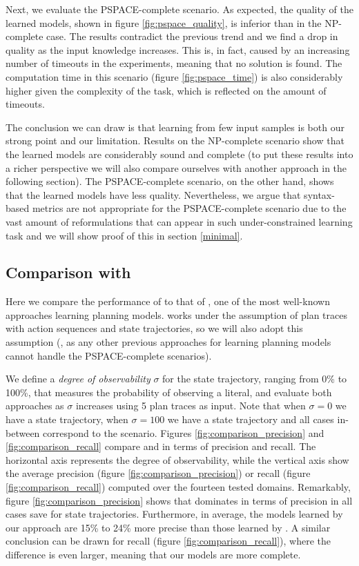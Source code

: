 Next, we evaluate the PSPACE-complete scenario. As expected, the quality of the learned models, shown in figure \ref{fig:pspace_quality}, is inferior than in the NP-complete case. The results contradict the previous trend and we find a drop in quality as the input knowledge increases. This is, in fact, caused by an increasing number of timeouts in the experiments, meaning that no solution is found. The computation time in this scenario (figure \ref{fig:pspace_time}) is also considerably higher given the complexity of the task, which is reflected on the amount of timeouts.

The conclusion we can draw is that learning from few input samples is both our strong point and our limitation. Results on the NP-complete scenario show that the learned models are considerably sound and complete (to put these results into a richer perspective we will also compare ourselves with another approach in the following section). The PSPACE-complete scenario, on the other hand, shows that the learned models have less quality. Nevertheless, we argue that syntax-based metrics are not appropriate for the PSPACE-complete scenario due to the vast amount of reformulations that can appear in such under-constrained learning task and we will show proof of this in section \ref{minimal}.


\subsection{Comparison with \ARMS}
Here we compare the performance of \FAMA to that of \ARMS, one of the most well-known approaches learning planning models. \ARMS works under the assumption of plan traces with \FO action sequences and \NO state trajectories, so we will also adopt this assumption (\ARMS, as any other previous approaches for learning planning models cannot handle the PSPACE-complete scenarios).

We define a \emph{degree of observability} $\sigma$ for the state trajectory, ranging from 0\% to 100\%, that measures the probability of observing a literal, and evaluate both approaches as $\sigma$ increases using 5 plan traces as input. Note that when $\sigma = 0$ we have a \NO state trajectory, when $\sigma=100$ we have a \FO state trajectory and all cases in-between correspond to the \PO scenario. Figures \ref{fig:comparison_precision} and \ref{fig:comparison_recall} compare \FAMA and \ARMS in terms of precision and recall. The horizontal axis represents the degree of observability, while the vertical axis show the average precision (figure \ref{fig:comparison_precision}) or recall (figure \ref{fig:comparison_recall}) computed over the fourteen tested domains. Remarkably, figure \ref{fig:comparison_precision} shows that \FAMA dominates in terms of precision in all cases save for \FO state trajectories. Furthermore, in average, the models learned by our approach are 15\% to 24\% more precise than those learned by \ARMS. A similar conclusion can be drawn for recall (figure \ref{fig:comparison_recall}), where the difference is even larger, meaning that our models are more complete.

